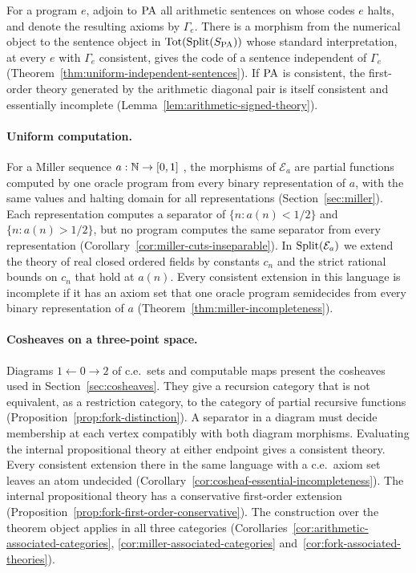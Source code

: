 For a program $e$, adjoin to $\mathrm{PA}$ all arithmetic sentences on whose
codes $e$ halts, and denote the resulting axioms by $\Gamma_e$.
There is a morphism from the numerical object to the sentence object
in $\operatorname{Tot}(\operatorname{Split}(S_{\mathrm{PA}}))$ whose standard interpretation, at every $e$
with $\Gamma_e$ consistent, gives the code of a sentence independent of
$\Gamma_e$ (Theorem~\ref{thm:uniform-independent-sentences}). If $\mathrm{PA}$ is
consistent, the first-order theory generated by the arithmetic diagonal
pair is itself consistent and essentially incomplete
(Lemma~\ref{lem:arithmetic-signed-theory}).

\paragraph{Uniform computation.}
For a Miller sequence $a:\mathbb N\to[0,1]$ \cite{Miller2004,BauerHanson}, the morphisms of
$\mathcal E_a$ are partial functions computed by one oracle program
from every binary representation of $a$, with the same values and halting
domain for all representations (Section~\ref{sec:miller}). Each
representation computes a separator of $\{n:a(n)<1/2\}$ and $\{n:a(n)>1/2\}$,
but no program computes the same separator from every representation
(Corollary~\ref{cor:miller-cuts-inseparable}). In $\operatorname{Split}(\mathcal E_a)$
we extend the theory of real closed ordered fields by constants $c_n$ and
the strict rational bounds on $c_n$ that hold at $a(n)$. Every consistent
extension in this language is incomplete if it has an axiom set that one
oracle program semidecides from every binary representation of $a$
(Theorem~\ref{thm:miller-incompleteness}).

\paragraph{Cosheaves on a three-point space.}
Diagrams $1\leftarrow0\to2$ of c.e.\ sets and computable maps present
the cosheaves used in Section~\ref{sec:cosheaves}.
They give a recursion category that is not equivalent, as a restriction
category, to the category of partial recursive functions
(Proposition~\ref{prop:fork-distinction}). A separator in a diagram
must decide membership at each vertex compatibly with both diagram
morphisms. Evaluating the internal propositional theory at either
endpoint gives a consistent theory. Every consistent extension there
in the same language with a c.e.\ axiom set leaves an atom undecided
(Corollary~\ref{cor:cosheaf-essential-incompleteness}).
The internal propositional theory has a conservative first-order
extension (Proposition~\ref{prop:fork-first-order-conservative}).
The construction over the theorem object applies in all three categories
(Corollaries~\ref{cor:arithmetic-associated-categories},
\ref{cor:miller-associated-categories} and~\ref{cor:fork-associated-theories}).

